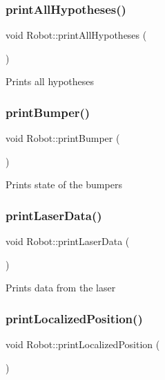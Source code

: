 \subsubsection{\texorpdfstring{print\+All\+Hypotheses()}{printAllHypotheses()}}
{\footnotesize\ttfamily void Robot\+::print\+All\+Hypotheses (\begin{DoxyParamCaption}{ }\end{DoxyParamCaption})}

Prints all hypotheses \mbox{\label{classRobot_a04301aeae6bb441235a9020f2b214fbf}} 
\subsubsection{\texorpdfstring{print\+Bumper()}{printBumper()}}
{\footnotesize\ttfamily void Robot\+::print\+Bumper (\begin{DoxyParamCaption}{ }\end{DoxyParamCaption})}

Prints state of the bumpers \mbox{\label{classRobot_a4117efa8d1191d33b76851e5b5b1b13d}} 
\subsubsection{\texorpdfstring{print\+Laser\+Data()}{printLaserData()}}
{\footnotesize\ttfamily void Robot\+::print\+Laser\+Data (\begin{DoxyParamCaption}{ }\end{DoxyParamCaption})}

Prints data from the laser \mbox{\label{classRobot_a1a53d881a3efe4825b2685951345bfcf}} 
\subsubsection{\texorpdfstring{print\+Localized\+Position()}{printLocalizedPosition()}}
{\footnotesize\ttfamily void Robot\+::print\+Localized\+Position (\begin{DoxyParamCaption}{ }\end{DoxyParamCaption})}

